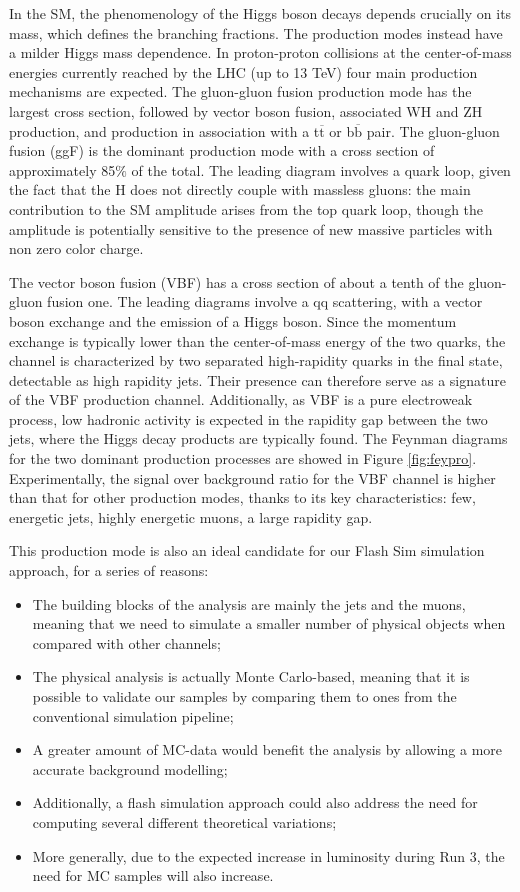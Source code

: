 In the SM, the phenomenology of the Higgs boson decays depends crucially on its mass,
which defines the branching fractions. The production modes instead have a milder Higgs
mass dependence. In proton-proton collisions at the center-of-mass energies currently reached by the LHC
(up to 13 TeV) four main production mechanisms are expected. The gluon-gluon fusion
production mode has the largest cross section, followed by vector boson fusion, associated
WH and ZH production, and production in association with a t$\overline{\text{t}}$  or b$\overline{\text{b}}$ pair. The gluon-gluon fusion (ggF) is the dominant production mode with a cross section of
approximately 85$\%$ of the total. The leading diagram involves a quark loop, given the fact that the H does not directly couple with massless gluons: the main
contribution to the SM amplitude arises from the top quark loop, though the amplitude is
potentially sensitive to the presence of new massive particles with non zero color charge.

The vector boson fusion (VBF) has a cross section of about a tenth of the gluon-gluon fusion one. The leading diagrams involve a qq scattering, with a
vector boson exchange and the emission of a Higgs boson. Since the momentum exchange
is typically lower than the center-of-mass energy of the two quarks, the channel is characterized by two separated high-rapidity quarks in the final state, detectable as high rapidity
jets. Their presence can therefore serve as a signature of the VBF production channel. Additionally, as VBF is a pure electroweak process, low hadronic activity is expected in the
rapidity gap between the two jets, where the Higgs decay products are typically found. The Feynman diagrams for the two dominant production processes are showed in Figure \ref{fig:feypro}. Experimentally, the signal over background ratio for the VBF channel is higher than that for other production modes, thanks to its key characteristics: few, energetic jets, highly energetic muons, a large rapidity gap.

This production mode is also an ideal candidate for our Flash Sim simulation approach, for a series of reasons:

\begin{itemize}
    \item The building blocks of the analysis are mainly the jets and the muons, meaning that we need to simulate a smaller number of physical objects when compared with other channels;
    \item The physical analysis is actually Monte Carlo-based, meaning that it is possible to validate our samples by comparing them to ones from the conventional simulation pipeline;
    \item A greater amount of MC-data would benefit the analysis by allowing a more accurate background modelling;
    \item Additionally, a flash simulation approach could also address the need for computing several different theoretical variations;
    \item More generally, due to the expected increase in luminosity during Run 3, the need for MC samples will also increase.
\end{itemize}


